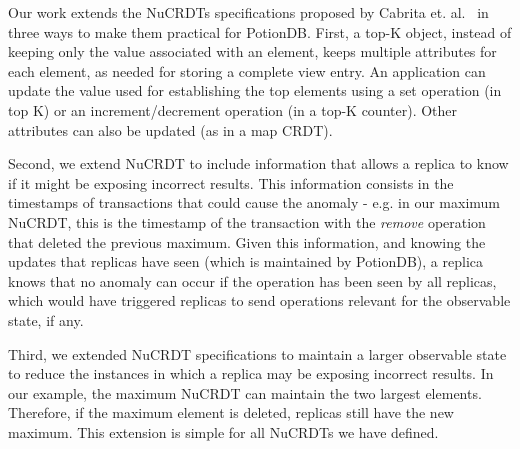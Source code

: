 \documentclass[sigplan,twocolumn,review,anonymous]{acmart}
\newcommand{\andre}[1]{\nbnote{Andre}{blue}{#1}}
\newcommand{\carla}[1]{\nbnote{Carla}{green}{#1}}
\begin{document}
Our work extends the NuCRDTs specifications proposed by Cabrita et. al.~\cite{Cabrita17Nonuniform}
in three ways to make them practical for PotionDB.
First,  a top-K object,  instead of keeping only the value associated with an element,  keeps multiple
attributes for each element, as needed for storing a complete view entry. An application can update
the value used for establishing the top elements using a set operation (in top K) or an increment/decrement 
operation (in a top-K counter).  Other attributes can also be updated (as in a map CRDT). %


Second, we extend NuCRDT to include information that allows a replica to know if it might be exposing incorrect results. 
This information consists in the timestamps of transactions that could cause the anomaly - e.g. in our maximum NuCRDT, 
this is the timestamp of the transaction with the \emph{remove} operation that deleted the previous maximum. 
Given this information, and knowing the updates that replicas have seen (which is maintained by PotionDB), 
a replica knows that no anomaly can occur if the operation has been seen by all replicas, 
which would have triggered replicas to send operations relevant for the observable state, if any.
 
Third, we extended NuCRDT specifications to maintain a larger observable state to 
reduce the instances in which a replica may be exposing incorrect results.
In our example, the maximum NuCRDT
can maintain the two largest elements. Therefore, if the maximum element
is deleted, replicas still have the new maximum. 
This extension is simple for all NuCRDTs we have defined.%
\end{document}
